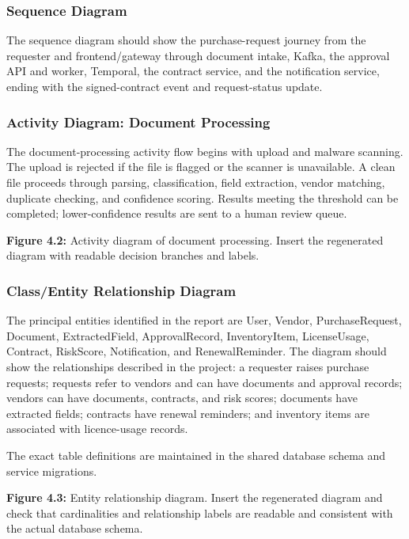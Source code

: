 \documentclass[12pt,a4paper]{report}
\begin{document}
\subsubsection{Sequence Diagram}

The sequence diagram should show the purchase-request journey from the
requester and frontend/gateway through document intake, Kafka, the
approval API and worker, Temporal, the contract service, and the
notification service, ending with the signed-contract event and
request-status update.

\subsubsection{Activity Diagram: Document Processing}

The document-processing activity flow begins with upload and malware
scanning. The upload is rejected if the file is flagged or the scanner
is unavailable. A clean file proceeds through parsing, classification,
field extraction, vendor matching, duplicate checking, and confidence
scoring. Results meeting the threshold can be completed; lower-confidence
results are sent to a human review queue.

\textbf{Figure 4.2:} Activity diagram of document processing. Insert
the regenerated diagram with readable decision branches and labels.

\subsubsection{Class/Entity Relationship Diagram}

The principal entities identified in the report are User, Vendor,
PurchaseRequest, Document, ExtractedField, ApprovalRecord,
InventoryItem, LicenseUsage, Contract, RiskScore, Notification, and
RenewalReminder. The diagram should show the relationships described in
the project: a requester raises purchase requests; requests refer to
vendors and can have documents and approval records; vendors can have
documents, contracts, and risk scores; documents have extracted fields;
contracts have renewal reminders; and inventory items are associated
with licence-usage records.

The exact table definitions are maintained in the shared database
schema and service migrations.

\textbf{Figure 4.3:} Entity relationship diagram. Insert the regenerated
diagram and check that cardinalities and relationship labels are
readable and consistent with the actual database schema.
\end{document}

